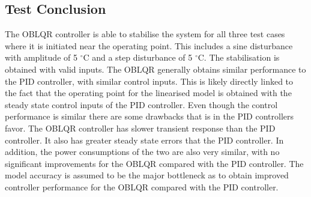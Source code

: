 \subsection{Test Conclusion}
The OBLQR controller is able to stabilise the system for all three test cases where it is initiated near the operating point. This includes a sine disturbance with amplitude of 5 $ ^{\circ} $C and a step disturbance of 5 $ ^{\circ} $C. The stabilisation is obtained with valid inputs. The OBLQR generally obtains similar performance to the PID controller, with similar control inputs. This is likely directly linked to the fact that the operating point for the linearised model is obtained with the steady state control inputs of the PID controller.
Even though the control performance is similar there are some drawbacks that is in the PID controllers favor. The OBLQR controller has slower transient response than the PID controller. It also has greater steady state errors that the PID controller. 
In addition, the power consumptions of the two are also very similar, with no significant improvements for the OBLQR compared with the PID controller.
The model accuracy is assumed to be the major bottleneck as to obtain improved controller performance for the OBLQR compared with the PID controller.
